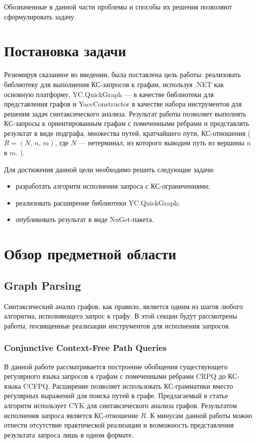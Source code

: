 \documentclass[14pt]{matmex-diploma-custom}
\begin{document}
	Обозначенные в данной части проблемы и способы их решения позволяют сформулировать задачу.
	
\section{Постановка задачи}
    Резюмируя сказанное во введении, была поставлена цель работы: реализовать библиотеку для выполнения КС-запросов к графам, используя .NET как основную платформу, YC.QuickGraph --- в качестве библиотеки для представления графов и YaccConstructor в качестве набора инструментов для решения задач синтаксического анализа. Результат работы позволяет выполнять КС-запросы к ориентированным графам с помеченными ребрами и представлять результат в виде подграфа, множества путей, кратчайшего пути, КС-отношения (\(R = (N,\, n,\, m)\), где \(N\) --- нетерминал, из которого выводим путь из вершины \(n\) в \(m\). ). 
    
    Для достижения данной цели необходимо решить следующие задачи:
	\begin{itemize}
	    \item разработать алгоритм исполнения запроса с КС-ограничениями;
        \item реализовать расширение библиотеки YC.QuickGraph;
        \item опубликовать результат в виде NuGet-пакета.
	\end{itemize}

\section{Обзор предметной области}
	\subsection{Graph Parsing}
	Синтаксический анализ графов, как правило, является одним из шагов любого алгоритма, исполняющего запрос к графу. В этой секции будут рассмотрены работы, посвященные реализации инструментов для исполнения запросов.
		\subsubsection*{Conjunctive Context-Free Path Queries}
		В данной работе рассматривается построение обобщения существующего регулярного языка запросов к графам с помеченными ребрами CRPQ до КС-языка CCFPQ. Расширение позволяет использовать КС-грамматики вместо регулярных выражений для поиска путей в графе. Предлагаемый в статье алгоритм использует CYK для синтаксического анализа графов. Результатом исполнения запроса является КС-отношение \(R\). К минусам данной работы можно отнести отсутствие практической реализации и возможность представления результата запроса лишь в одном формате.
\end{document}
